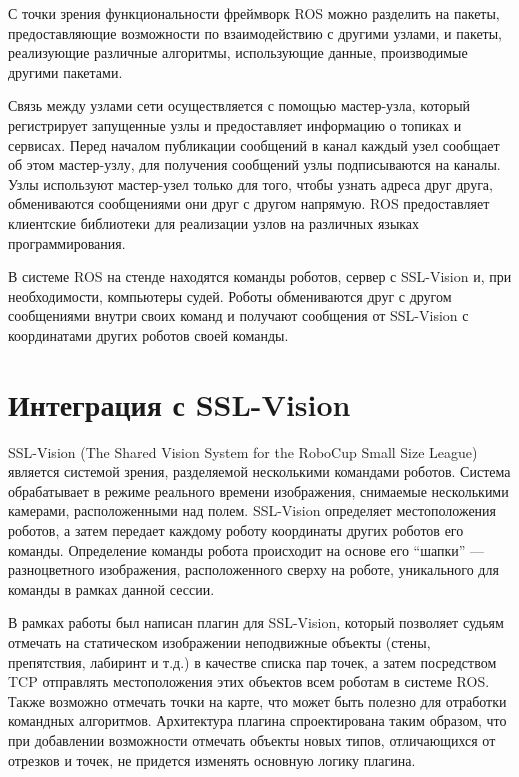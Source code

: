 \documentclass{spisok-article}
\begin{document}
С точки зрения функциональности фреймворк ROS можно разделить на пакеты, предоставляющие возможности по взаимодействию с другими узлами, и пакеты, реализующие различные алгоритмы, использующие данные, производимые другими пакетами.

Связь между узлами сети осуществляется с помощью мастер-узла, который регистрирует запущенные узлы и предоставляет информацию о топиках и сервисах. Перед началом публикации сообщений в канал каждый узел сообщает об этом мастер-узлу, для получения сообщений узлы подписываются на каналы. Узлы используют мастер-узел только для того, чтобы узнать адреса друг друга, обмениваются сообщениями они друг с другом напрямую.  ROS предоставляет клиентские библиотеки для реализации узлов на различных языках программирования.

В системе ROS на стенде находятся команды роботов, сервер с SSL-Vision и, при необходимости, компьютеры судей. Роботы обмениваются друг с другом сообщениями внутри своих команд и получают сообщения от SSL-Vision с координатами других роботов своей команды.

\section{Интеграция с SSL-Vision}

SSL-Vision (The Shared Vision System for the RoboCup Small Size League)~\cite{zickler2010sslvision} является системой зрения, разделяемой несколькими командами роботов. Система обрабатывает в режиме реального времени изображения, снимаемые несколькими камерами, расположенными над полем. SSL-Vision определяет местоположения роботов, а затем передает каждому роботу координаты других роботов его команды. Определение команды робота происходит на основе его ``шапки'' --- разноцветного изображения, расположенного сверху на роботе, уникального для команды в рамках данной сессии.

В рамках работы был написан плагин для SSL-Vision, который позволяет судьям отмечать на статическом изображении неподвижные объекты (стены, препятствия, лабиринт и т.д.) в качестве списка пар точек, а затем посредством TCP отправлять местоположения этих объектов всем роботам в системе ROS. Также возможно отмечать точки на карте, что может быть полезно для отработки командных алгоритмов. Архитектура плагина спроектирована таким образом, что при добавлении возможности отмечать объекты новых типов, отличающихся от отрезков и точек, не придется изменять основную логику плагина.
\end{document}
